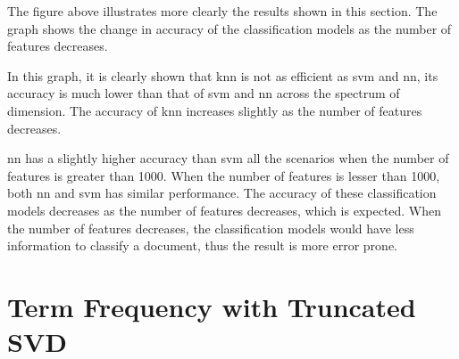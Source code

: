The figure above illustrates more clearly the results shown in this section. The graph shows the change in accuracy of the classification models as the number of features decreases.

In this graph, it is clearly shown that \ac{knn} is not as efficient as \ac{svm} and \ac{nn}, its accuracy is much lower than that of \ac{svm} and \ac{nn} across the spectrum of dimension. The accuracy of \ac{knn} increases slightly as the number of features decreases.

\Ac{nn} has a slightly higher accuracy than \ac{svm} all the scenarios when the number of features is greater than 1000. When the number of features is lesser than 1000, both \ac{nn} and \ac{svm} has similar performance. The accuracy of these classification models decreases as the number of features decreases, which is expected. When the number of features decreases, the classification models would have less information to classify a document, thus the result is more error prone.\\

\section{Term Frequency with Truncated SVD}

